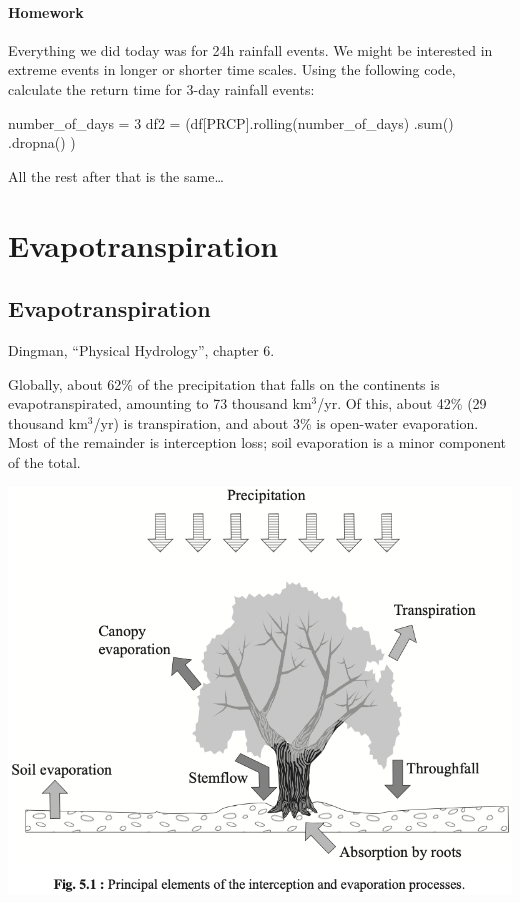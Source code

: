 \documentclass[
  letterpaper,
  DIV=11,
  numbers=noendperiod]{scrreprt}
\newenvironment{Shaded}{\begin{snugshade}}{\end{snugshade}}
\newcommand{\BuiltInTok}[1]{\textcolor[rgb]{0.00,0.23,0.31}{#1}}
\newcommand{\DecValTok}[1]{\textcolor[rgb]{0.68,0.00,0.00}{#1}}
\newcommand{\NormalTok}[1]{\textcolor[rgb]{0.00,0.23,0.31}{#1}}
\newcommand{\OperatorTok}[1]{\textcolor[rgb]{0.37,0.37,0.37}{#1}}
\newcommand{\StringTok}[1]{\textcolor[rgb]{0.13,0.47,0.30}{#1}}
\begin{document}
\hypertarget{homework-2}{%
\subsection{Homework}\label{homework-2}}

Everything we did today was for 24h rainfall events. We might be
interested in extreme events in longer or shorter time scales. Using the
following code, calculate the return time for 3-day rainfall events:

\begin{Shaded}
\begin{Highlighting}[]
\NormalTok{number\_of\_days }\OperatorTok{=} \DecValTok{3}
\NormalTok{df2 }\OperatorTok{=}\NormalTok{ (df[}\StringTok{\textquotesingle{}PRCP\textquotesingle{}}\NormalTok{].rolling(number\_of\_days)}
\NormalTok{                 .}\BuiltInTok{sum}\NormalTok{()}
\NormalTok{                 .dropna()}
\NormalTok{      ) }
\end{Highlighting}
\end{Shaded}

All the rest after that is the same\ldots{}

\part{Evapotranspiration}

\hypertarget{evapotranspiration-2}{%
\chapter{Evapotranspiration}\label{evapotranspiration-2}}

Dingman, ``Physical Hydrology'', chapter 6.

Globally, about 62\% of the precipitation that falls on the continents
is evapotranspirated, amounting to 73 thousand km\(^3\)/yr. Of this,
about 42\% (29 thousand km\(^3\)/yr) is transpiration, and about 3\% is
open-water evaporation. Most of the remainder is interception loss; soil
evaporation is a minor component of the total.

\includegraphics{archive/figures/musy-figure5.1.png}
\end{document}
